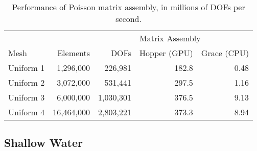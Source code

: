 \begin{table}[t]
    \centering
\begin{tabular}{lrrrr}
\toprule
          &          &             & \multicolumn{2}{l}{Matrix Assembly} \\
                                     \cmidrule(lr){4-5}
Mesh      & Elements & DOFs        & Hopper (GPU) & Grace (CPU) \\
\midrule
Uniform 1 &  1,296,000 &   226,981 & 182.8 & 0.48 \\
Uniform 2 &  3,072,000 &   531,441 & 297.5 & 1.16 \\
Uniform 3 &  6,000,000 & 1,030,301 & 376.5 & 9.13 \\
Uniform 4 & 16,464,000 & 2,803,221 & 373.3 & 8.94 \\
\bottomrule
\end{tabular}
\caption{Performance of Poisson matrix assembly, in millions of DOFs per second.}
    \label{tab:poisson_results}
\end{table}

\subsection*{Shallow Water}

